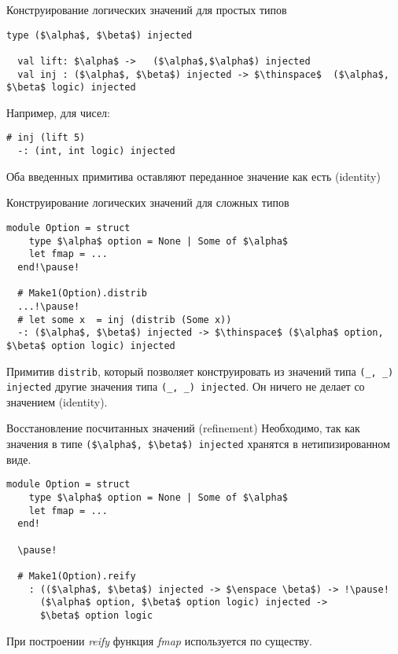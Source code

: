 \documentclass[10pt, mathserif]{beamer}
\theoremstyle{definition}
\begin{document}
\begin{frame}[fragile]{Конструирование логических значений для простых типов}
  \begin{lstlisting}[mathescape=true]
  type ($\alpha$, $\beta$) injected

  val lift: $\alpha$ ->   ($\alpha$,$\alpha$) injected
  val inj : ($\alpha$, $\beta$) injected -> $\thinspace$  ($\alpha$, $\beta$ logic) injected
  \end{lstlisting}
  \pause\vskip 1cm
  Например, для чисел:
  \begin{lstlisting}[mathescape=true]
  # inj (lift 5)
  -: (int, int logic) injected
  \end{lstlisting}
  \pause
  Оба введенных примитива оставляют переданное значение как есть (identity)
\end{frame}

\begin{frame}[fragile]{Конструирование логических значений для сложных типов}
  \begin{lstlisting}[mathescape=true]
  module Option = struct
    type $\alpha$ option = None | Some of $\alpha$
    let fmap = ...
  end!\pause!

  # Make1(Option).distrib
  ...!\pause!
  # let some x  = inj (distrib (Some x))
  -: ($\alpha$, $\beta$) injected -> $\thinspace$ ($\alpha$ option, $\beta$ option logic) injected
  \end{lstlisting}
  \pause

  Примитив \lstinline{distrib}, который позволяет конструировать из значений типа \lstinline{(_, _) injected} 
  другие значения типа \lstinline{(_, _) injected}.
  \vskip 1cm
  Он ничего не делает со значением (identity).
  

\end{frame}

\begin{frame}[fragile]{Восстановление посчитанных значений (refinement)}
  Необходимо, так как значения в типе \lstinline[mathescape=true]{($\alpha$, $\beta$) injected} хранятся в
  нетипизированном виде.

  \begin{lstlisting}[mathescape=true]
  module Option = struct
    type $\alpha$ option = None | Some of $\alpha$
    let fmap = ...
  end!

  \pause!

  # Make1(Option).reify
    : (($\alpha$, $\beta$) injected -> $\enspace \beta$) -> !\pause!
      ($\alpha$ option, $\beta$ option logic) injected -> 
      $\beta$ option logic

  \end{lstlisting}

  При построении \emph{reify} функция \emph{fmap} используется по существу.
\end{frame}
\end{document}
